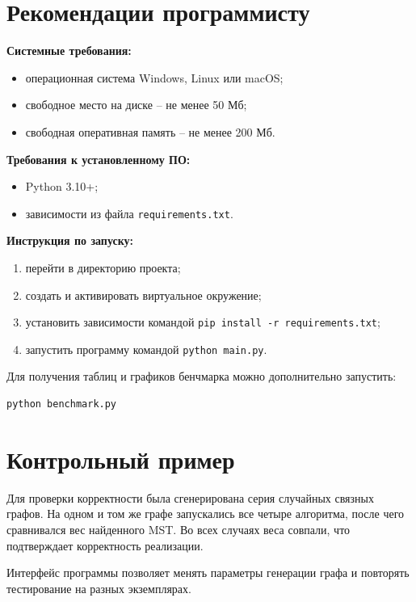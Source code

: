 \documentclass[12pt,a4paper]{article}
\begin{document}
\section{Рекомендации программисту}
\label{sec:dev_guide}

\textbf{Системные требования:}
\begin{itemize}
  \item операционная система Windows, Linux или macOS;
  \item свободное место на диске -- не менее 50 Мб;
  \item свободная оперативная память -- не менее 200 Мб.
\end{itemize}

\textbf{Требования к установленному ПО:}
\begin{itemize}
  \item Python 3.10+;
  \item зависимости из файла \texttt{requirements.txt}.
\end{itemize}

\textbf{Инструкция по запуску:}
\begin{enumerate}
  \item перейти в директорию проекта;
  \item создать и активировать виртуальное окружение;
  \item установить зависимости командой \texttt{pip install -r requirements.txt};
  \item запустить программу командой \texttt{python main.py}.
\end{enumerate}

Для получения таблиц и графиков бенчмарка можно дополнительно запустить:
\begin{lstlisting}[language=bash]
python benchmark.py
\end{lstlisting}

\section{Контрольный пример}
\label{sec:test_case}

Для проверки корректности была сгенерирована серия случайных связных графов. На одном и том же графе запускались все четыре алгоритма, после чего сравнивался вес найденного MST. Во всех случаях веса совпали, что подтверждает корректность реализации.

Интерфейс программы позволяет менять параметры генерации графа и повторять тестирование на разных экземплярах.
\end{document}

